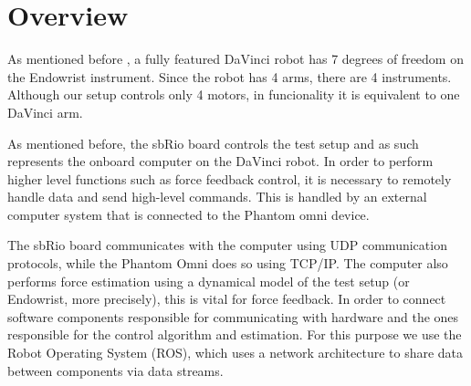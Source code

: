 \section{Overview}
As mentioned before , a fully featured DaVinci robot has 7 degrees of freedom on the Endowrist instrument.
Since the robot has 4 arms, there are 4 instruments.
Although our setup controls only 4 motors, in funcionality it is equivalent to one DaVinci arm.

As mentioned before, the sbRio board controls the test setup and as such represents the onboard computer on the DaVinci robot.
In order to perform higher level functions such as force feedback control, it is necessary to remotely handle data and send high-level commands.
This is handled by an external computer system that is connected to the Phantom omni device.

The sbRio board communicates with the computer using UDP communication protocols, while the Phantom Omni does so using TCP/IP.
The computer also performs force estimation using a dynamical model of the test setup (or Endowrist, more precisely), this is vital for force feedback.
In order to connect software components responsible for communicating with hardware and the ones responsible for the control algorithm and estimation.
For this purpose we use the Robot Operating System (ROS), which uses a network architecture to share data between components via data streams.





